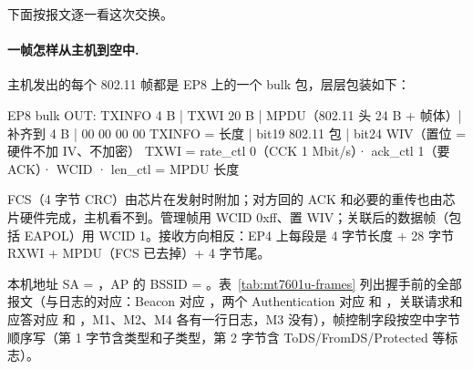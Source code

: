 下面按报文逐一看这次交换。

\paragraph{一帧怎样从主机到空中.} 主机发出的每个 802.11 帧都是 EP8 上的一个 bulk 包，层层包装如下：
\begin{txtcode}
EP8 bulk OUT:  TXINFO 4 B | TXWI 20 B | MPDU（802.11 头 24 B + 帧体）| 补齐到 4 B | 00 00 00 00
TXINFO  = 长度 | bit19 802.11 包 | bit24 WIV（置位 = 硬件不加 IV、不加密）
TXWI    = rate_ctl 0（CCK 1 Mbit/s）· ack_ctl 1（要 ACK）· WCID · len_ctl = MPDU 长度
\end{txtcode}
FCS（4 字节 CRC）由芯片在发射时附加；对方回的 ACK 和必要的重传也由芯片硬件完成，主机看不到。管理帧用 WCID 0xff、置 WIV；关联后的数据帧（包括 EAPOL）用 WCID 1。接收方向相反：EP4 上每段是 4 字节长度 + 28 字节 RXWI + MPDU（FCS 已去掉）+ 4 字节尾。

本机地址 SA = ，AP 的 BSSID = 。表~\ref{tab:mt7601u-frames} 列出握手前的全部报文（与日志的对应：Beacon 对应 ，两个 Authentication 对应  和 ，关联请求和应答对应  和 ，M1、M2、M4 各有一行日志，M3 没有），帧控制字段按空中字节顺序写（第 1 字节含类型和子类型，第 2 字节含 ToDS/FromDS/Protected 等标志）。

